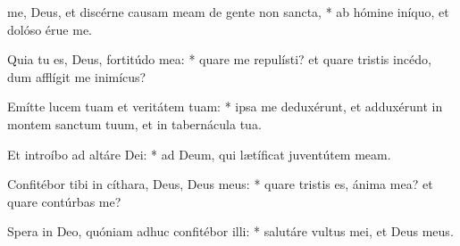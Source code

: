 \begin{psalmus}

 me, Deus, et discérne causam meam de gente non sancta, * ab hómine iníquo, et dolóso érue me.

Quia tu es, Deus, fortitúdo mea: * quare me repulísti? et quare tristis incédo, dum afflígit me inimícus?

Emítte lucem tuam et veritátem tuam: * ipsa me deduxérunt, et adduxérunt in montem sanctum tuum, et in tabernácula tua.

Et introíbo ad altáre Dei: * ad Deum, qui lætíficat juventútem meam.

Confitébor tibi in cíthara, Deus, Deus meus: * quare tristis es, ánima mea? et quare contúrbas me?

Spera in Deo, quóniam adhuc confitébor illi: * salutáre vultus mei, et Deus meus.

\end{psalmus}
